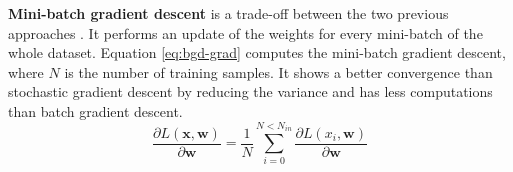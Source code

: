 \textbf{Mini-batch gradient descent} is a trade-off between the two previous approaches \cite{ruder_overview_2017, matteucci_artificial_2019}. It performs an update of the weights for every mini-batch of the whole dataset. Equation \eqref{eq:bgd-grad} computes the mini-batch gradient descent, where $N$ is the number of training samples. It shows a better convergence than stochastic gradient descent by reducing the variance and has less computations than batch gradient descent.
%
\begin{equation}
    \frac{ \partial L( \boldsymbol{x}, \boldsymbol{w} ) }{\partial \boldsymbol{w}} = \frac{1}{N} \sum^{N < N_{in}}_{i = 0} \frac{ \partial L( x_i, \boldsymbol{w} ) }{\partial \boldsymbol{w}}
    \label{eq:bgd-grad}
\end{equation}
